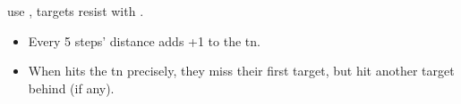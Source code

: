 use , targets resist with .

\begin{itemize}
  \item
  Every 5 \glspl{step}' distance adds +1 to the \gls{tn}.
  \item
  When  hits the \gls{tn} precisely, they miss their first target, but hit another target behind (if any).
\end{itemize}
